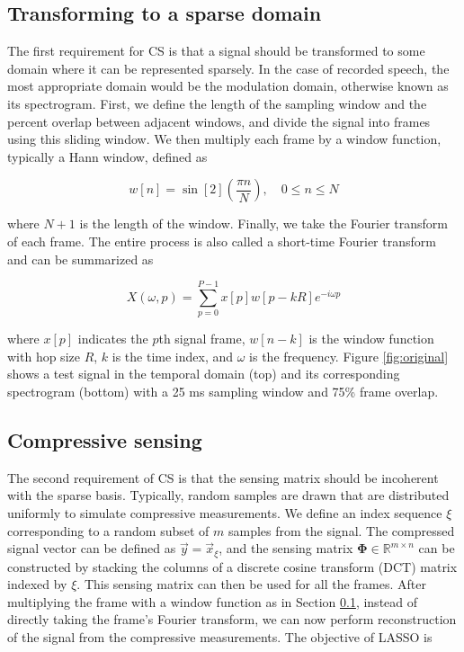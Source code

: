 \documentclass[10pt,a4paper,twoside]{article}
\begin{document}
\subsection{Transforming to a sparse domain}\label{ssec:sparse}
The first requirement for CS is that a signal should be transformed to some domain where it can be represented sparsely. In the case of recorded speech, the most appropriate domain would be the modulation domain, otherwise known as its spectrogram. First, we define the length of the sampling window and the percent overlap between adjacent windows, and divide the signal into frames using this sliding window. We then multiply each frame by a window function, typically a Hann window, defined as

\begin{equation}\label{eq:hann}
	w[n] = \sin[2](\frac{\pi n}{N}), \quad 0 \leq n \leq N
\end{equation}

\noindent where $N+1$ is the length of the window. Finally, we take the Fourier transform of each frame. The entire process is also called a short-time Fourier transform and can be summarized as

\begin{equation}\label{eq:stft}
	X(\omega, p) = \sum_{p=0}^{P-1} x[p] w[p - kR] e^{-i\omega p}
\end{equation}

\noindent where $x[p]$ indicates the $p$th signal frame, $w[n-k]$ is the window function with hop size $R$, $k$ is the time index, and $\omega$ is the frequency. Figure \ref{fig:original} shows a test signal in the temporal domain (top) and its corresponding spectrogram (bottom) with a 25 ms sampling window and 75\% frame overlap.

\subsection{Compressive sensing}\label{ssec:cs}
The second requirement of CS is that the sensing matrix should be incoherent with the sparse basis. Typically, random samples are drawn that are distributed uniformly to simulate compressive measurements. We define an index sequence $\xi$ corresponding to a random subset of $m$ samples from the signal. The compressed signal vector can be defined as $\vec{y} = \vec{x}_\xi$, and the sensing matrix $\bm\Phi \in \mathbb{R}^{m \times n}$ can be constructed by stacking the columns of a discrete cosine transform (DCT) matrix indexed by $\xi$. This sensing matrix can then be used for all the frames. After multiplying the frame with a window function as in Section \ref{ssec:sparse}, instead of directly taking the frame's Fourier transform, we can now perform reconstruction of the signal from the compressive measurements. The objective of LASSO \cite{scikit-learn} is
\end{document}
